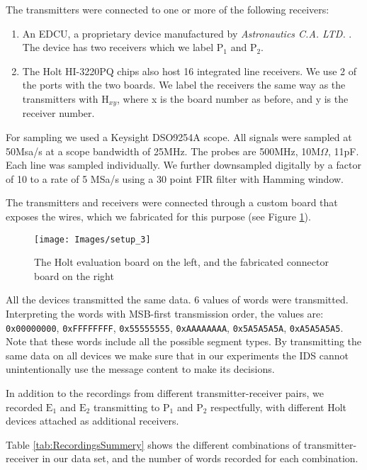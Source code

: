 \documentclass[conference]{IEEEtran}
\begin{document}
  The transmitters were connected to one or more of the following receivers:
  \begin{enumerate}
    \item An EDCU, a proprietary device manufactured by \textit{Astronautics C.A. LTD.} \cite{astronautics2019edcu}. The device has two receivers which we label \(\text{P}_1\) and \(\text{P}_2\).
    \item The Holt HI-3220PQ chips also host 16 integrated line receivers. We use 2 of the ports with the two boards. We label the receivers the same way as the transmitters with \(\text{H}_{xy}\), where x is the board number as before, and y is the receiver number.
  \end{enumerate}
  
  For sampling we used a Keysight DSO9254A scope. All signals were sampled at 50Msa/s at a scope bandwidth of 25MHz. The probes are 500MHz, 10M\(\Omega\), 11pF. Each line was sampled individually. We further downsampled digitally by a factor of 10 to a rate of 5 MSa/s using a 30 point FIR filter with Hamming window.
  
  The transmitters and receivers were connected through a custom board that exposes the wires, which we fabricated for this purpose (see Figure \ref{fig:SetupImage}).
  
  \begin{figure}[t]
    \centering
    \texttt{[image: Images/setup\_3]}
    \caption{The Holt evaluation board on the left, and the fabricated connector board on the right}
    \label{fig:SetupImage}
  \end{figure}
  
  All the devices transmitted the same data. 6 values of words were transmitted. Interpreting the words with MSB-first transmission order, the values are: \texttt{0x00000000}, \texttt{0xFFFFFFFF}, \texttt{0x55555555}, \texttt{0xAAAAAAAA}, \texttt{0x5A5A5A5A}, \texttt{0xA5A5A5A5}. Note that these words include all the possible segment types. By transmitting the same data on all devices we make sure that in our experiments the IDS cannot unintentionally use the message content to make its decisions.
  
  In addition to the recordings from different transmitter-receiver pairs, we recorded \(\text{E}_1\) and \(\text{E}_2\) transmitting to \(\text{P}_1\) and \(\text{P}_2\) respectfully, with different Holt devices attached as additional receivers.
  
  Table \ref{tab:RecordingsSummery} shows the different combinations of transmitter-receiver in our data set, and the number of words recorded for each combination.
  
\end{document}
